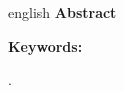 \vspace{-5mm}{\color{FIA24}\rule{\textwidth}{0.4pt}}
\ResumoTexto
\begin{otherlanguage*}{english}
{\EnglishTitle}
		{\textbf{Abstract}} 
		
		{\fontsize{11}{12.5}\selectfont
		\AbstractArtigo
		\par}
		\fontsize{11}{12}\selectfont
		\textbf{Keywords:\,}{\fontsize{11}{12}\selectfont 
		\KeywordsArtigo{}.
		\par}
	  \vspace{4mm}
\end{otherlanguage*}		
\pagestyle{plain}
\par\fontsize{12}{13}\selectfont 
\singlespacing
